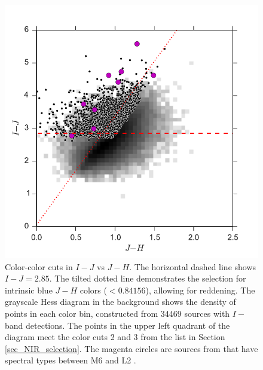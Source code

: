 \begin{figure}[ht!]
  \caption[Photometric selection color-color cuts in $I-J$ vs $J-H$]{Color-color cuts in $I-J$ vs $J-H$. The horizontal dashed line shows $I-J=2.85$.  The tilted dotted line demonstrates the selection for intrinsic blue $J-H$ colors ($<0.84156$), allowing for reddening.  The grayscale Hess diagram in the background shows the density of points in each color bin, constructed from 34469 sources with $I-$band detections.  The points in the upper left quadrant of the diagram meet the color cuts 2 and 3 from the list in Section \ref{sec_NIR_selection}.  The magenta circles are sources from \citet{allers06} that have spectral types between M6 and L2 \citep{2011ASPC..448..633G}.\label{fig_NIR_selection_JH}}
\centering
\includegraphics[scale=0.6]{chIMACS/figures/NIR_selection_allers_M6_L2}
\end{figure}

